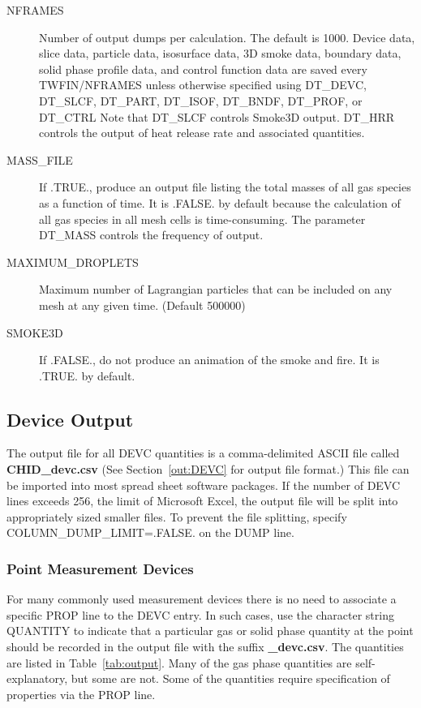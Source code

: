 \documentclass[11pt]{book}
\begin{document}
\begin{description}
\item[{\ct NFRAMES}] Number of output dumps per calculation. The default is 1000.
Device data, slice data, particle data, isosurface data, 3D smoke data, boundary data, solid phase profile data, and
control function data are saved every {\ct TWFIN/NFRAMES} unless otherwise specified
using {\ct DT\_DEVC}, {\ct DT\_SLCF}, {\ct DT\_PART}, {\ct DT\_ISOF}, {\ct DT\_BNDF}, {\ct DT\_PROF},
or {\ct DT\_CTRL} Note that {\ct DT\_SLCF} controls Smoke3D output. {\ct DT\_HRR} controls the
output of heat release rate and associated quantities.
\item[{\ct MASS\_FILE}] If {\ct .TRUE.}, produce an output file listing the total masses of all gas species as a function of time. It is {\ct .FALSE.} by default because the calculation
of all gas species in all mesh cells is time-consuming. The parameter {\ct DT\_MASS} controls the frequency of output.
\item[{\ct MAXIMUM\_DROPLETS}] Maximum number of Lagrangian particles that can be included on any
mesh at any given time. (Default 500000)
\item[{\ct SMOKE3D}] If {\ct .FALSE.}, do not produce an animation of the smoke and fire. It is {\ct .TRUE.} by default.
\end{description}


\subsection{Device Output}
\label{info:out:DEVC}

The output file for all {\ct DEVC} quantities is a comma-delimited
ASCII file called {\bf CHID\_devc.csv} (See Section~\ref{out:DEVC} for output file format.)
This file can be imported into most spread sheet software packages. If the number of {\ct DEVC} lines
exceeds 256, the limit of Microsoft Excel, the output file will be split into appropriately sized smaller
files. To prevent the file splitting, specify {\ct COLUMN\_DUMP\_LIMIT=.FALSE.} on the {\ct DUMP} line.

\subsubsection{Point Measurement Devices}

For many commonly used measurement devices there is no need to associate a
specific {\ct PROP} line to the {\ct DEVC} entry. In such cases, use the character string
{\ct QUANTITY} to indicate that a particular gas or solid phase quantity at the point should be recorded in
the output file with the suffix {\bf \_devc.csv}. The quantities are listed in Table~\ref{tab:output}.
Many of the gas phase quantities are self-explanatory, but some are not. Some of the quantities require specification of
properties via the {\ct PROP} line.
\end{document}
